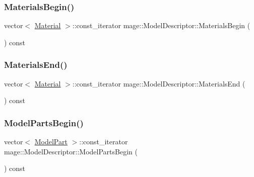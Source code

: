 \subsubsection{\texorpdfstring{Materials\+Begin()}{MaterialsBegin()}}
{\footnotesize\ttfamily vector$<$ \hyperlink{structmage_1_1_material}{Material} $>$\+::const\+\_\+iterator mage\+::\+Model\+Descriptor\+::\+Materials\+Begin (\begin{DoxyParamCaption}{ }\end{DoxyParamCaption}) const}

\hypertarget{classmage_1_1_model_descriptor_a3e1880190d58d4d1bc308766f804047d}{}\label{classmage_1_1_model_descriptor_a3e1880190d58d4d1bc308766f804047d} 
\subsubsection{\texorpdfstring{Materials\+End()}{MaterialsEnd()}}
{\footnotesize\ttfamily vector$<$ \hyperlink{structmage_1_1_material}{Material} $>$\+::const\+\_\+iterator mage\+::\+Model\+Descriptor\+::\+Materials\+End (\begin{DoxyParamCaption}{ }\end{DoxyParamCaption}) const}

\hypertarget{classmage_1_1_model_descriptor_a721a81fae1d5613af8a3a037577ce454}{}\label{classmage_1_1_model_descriptor_a721a81fae1d5613af8a3a037577ce454} 
\subsubsection{\texorpdfstring{Model\+Parts\+Begin()}{ModelPartsBegin()}}
{\footnotesize\ttfamily vector$<$ \hyperlink{structmage_1_1_model_part}{Model\+Part} $>$\+::const\+\_\+iterator mage\+::\+Model\+Descriptor\+::\+Model\+Parts\+Begin (\begin{DoxyParamCaption}{ }\end{DoxyParamCaption}) const}

\hypertarget{classmage_1_1_model_descriptor_a97f78d3e5a157020f62f5e6003deaac6}{}\label{classmage_1_1_model_descriptor_a97f78d3e5a157020f62f5e6003deaac6} 
